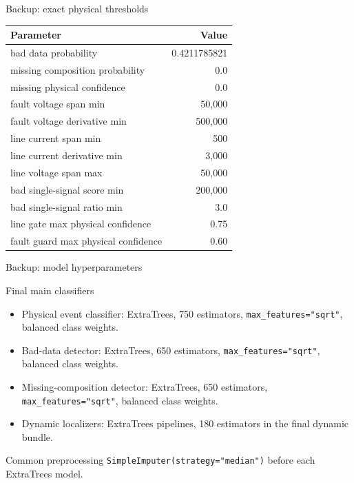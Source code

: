 \documentclass[10pt,aspectratio=169]{beamer}
\newcommand{\code}[1]{\texttt{\footnotesize #1}}
\begin{document}
\begin{frame}{Backup: exact physical thresholds}
\small
\centering
\begin{tabular}{lr}
\toprule
\textbf{Parameter} & \textbf{Value}\\
\midrule
bad data probability & 0.4211785821\\
missing composition probability & 0.0\\
missing physical confidence & 0.0\\
fault voltage span min & 50,000\\
fault voltage derivative min & 500,000\\
line current span min & 500\\
line current derivative min & 3,000\\
line voltage span max & 50,000\\
bad single-signal score min & 200,000\\
bad single-signal ratio min & 3.0\\
line gate max physical confidence & 0.75\\
fault guard max physical confidence & 0.60\\
\bottomrule
\end{tabular}
\end{frame}

\begin{frame}{Backup: model hyperparameters}
\small
\begin{block}{Final main classifiers}
\begin{itemize}
  \item Physical event classifier: ExtraTrees, 750 estimators, \code{max\_features="sqrt"}, balanced class weights.
  \item Bad-data detector: ExtraTrees, 650 estimators, \code{max\_features="sqrt"}, balanced class weights.
  \item Missing-composition detector: ExtraTrees, 650 estimators, \code{max\_features="sqrt"}, balanced class weights.
  \item Dynamic localizers: ExtraTrees pipelines, 180 estimators in the final dynamic bundle.
\end{itemize}
\end{block}
\begin{alertblock}{Common preprocessing}
\code{SimpleImputer(strategy="median")} before each ExtraTrees model.
\end{alertblock}
\end{frame}
\end{document}
